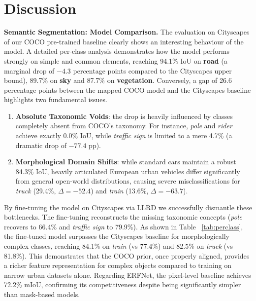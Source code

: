 \documentclass[10pt,twocolumn,letterpaper]{article}
\begin{document}
\section{Discussion}

\textbf{Semantic Segmentation: Model Comparison.}
The evaluation on Cityscapes of our COCO pre-trained baseline clearly shows an interesting behaviour of the model. A detailed per-class analysis demonstrates how the model performs strongly on simple and common elements, reaching 94.1\% IoU on \textbf{road} (a marginal drop of $-4.3$ percentage points compared to the Cityscapes upper bound), 89.7\% on \textbf{sky} and 87.7\% on \textbf{vegetation}. Conversely, a gap of 26.6 percentage points between the mapped COCO model and the Cityscapes baseline highlights two fundamental issues.

\begin{enumerate}
    \item \textbf{Absolute Taxonomic Voids}: the drop is heavily influenced by classes completely absent from COCO's taxonomy. For instance, \textit{pole} and \textit{rider} achieve exactly 0.0\% IoU, while \textit{traffic sign} is limited to a mere 4.7\% (a dramatic drop of $-77.4$ pp).

    \item \textbf{Morphological Domain Shifts}: while standard cars maintain a robust 84.3\% IoU, heavily articulated European urban vehicles differ significantly from general open-world distributions, causing severe misclassifications for \textit{truck} (29.4\%, $\Delta = -52.4$) and \textit{train} (13.6\%, $\Delta = -63.7$).
\end{enumerate}

By fine-tuning the model on Cityscapes via LLRD we successfully dismantle these bottlenecks. The fine-tuning reconstructs the missing taxonomic concepts (\textit{pole} recovers to 66.4\% and \textit{traffic sign} to 79.9\%). As shown in Table ~\ref{tab:perclass}, the fine-tuned model surpasses the Cityscapes baseline for morphologically complex classes, reaching 84.1\% on \textit{train} (vs 77.4\%) and 82.5\% on \textit{truck} (vs 81.8\%). This demonstrates that the COCO prior, once properly aligned, provides a richer feature representation for complex objects compared to training on narrow urban datasets alone.
Regarding ERFNet, the pixel-level baseline achieves 72.2\% mIoU, 
confirming its competitiveness despite being significantly simpler than mask-based models.
\end{document}

